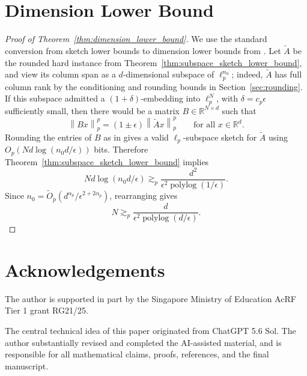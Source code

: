 \documentclass[11pt]{article}
\theoremstyle{remark}
\theoremstyle{definition}
\newcommand{\R}{\mathbb{R}}
\newcommand{\eps}{\epsilon}
\newcommand{\norm}[1]{\left\|#1\right\|}
\DeclareMathOperator{\polylog}{polylog}
\begin{document}
\section{Dimension Lower Bound}
\begin{proof}[Proof of Theorem~\ref{thm:dimension_lower_bound}]
	We use the standard conversion from sketch lower bounds to dimension lower bounds
	from \cite{LWW21}. Let $\widetilde A$ be the rounded hard instance from
	Theorem~\ref{thm:subspace_sketch_lower_bound}, and view its column span as a
	$d$-dimensional subspace of $\ell_p^{n_0}$; indeed, $\widetilde A$ has full column rank by the conditioning and rounding bounds in Section~\ref{sec:rounding}. If this
	subspace admitted a $(1+\delta)$-embedding into $\ell_p^N$, with
	$\delta = c_p\eps$ sufficiently small, then there would be a matrix
	$B\in\R^{N\times d}$ such that
	\[
		\norm{Bx}_p^p=(1\pm \eps)\norm{\widetilde A x}_p^p
		\qquad\text{for all }x\in\R^d .
	\]
	Rounding the entries of $B$ as in \cite{LWW21} gives a valid
	$\ell_p$-subspace sketch for $\widetilde A$ using
	$O_p(Nd\log(n_0d/\eps))$ bits. Therefore Theorem~\ref{thm:subspace_sketch_lower_bound}
	implies
	\[
		N d \log(n_0 d/\eps)
		\gtrsim_p
		\frac{d^2}{\eps^2\polylog(1/\eps)}.
	\]
	Since $n_0=\widetilde O_p(d^{\alpha_p}/\eps^{2+2\alpha_p})$, rearranging gives
	\[
		N \gtrsim_p \frac{d}{\eps^2\polylog(d/\eps)} .
	\]
\end{proof}

\section*{Acknowledgements}
The author is supported in part by the Singapore Ministry of Education AcRF Tier 1 grant RG21/25.

The central technical idea of this paper originated from ChatGPT 5.6 Sol. The author substantially revised and completed the AI-assisted material, and is responsible for all mathematical claims, proofs, references, and the final manuscript.



\end{document}
